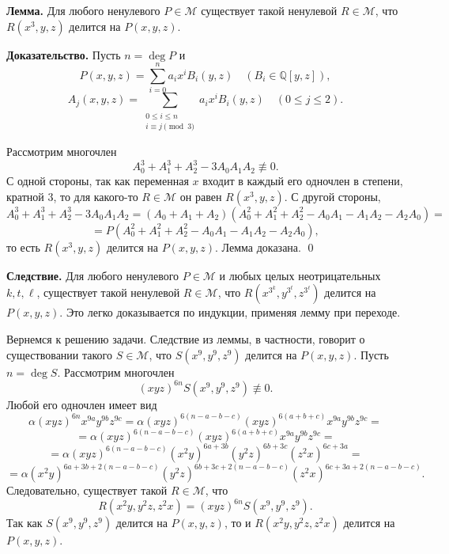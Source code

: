 \documentclass[12pt]{article}
\def \Lemma{\par \bigskip \textbf{Лемма. }}
\def \proof{\par \bigskip \textbf{Доказательство. }}
\def \corollary{\par \bigskip \textbf{Следствие. }}
\begin{document}
\Lemma Для любого ненулевого $P \in \mathcal{M}$ существует такой ненулевой $R \in \mathcal{M}$, что $R(x^3, y, z)$ делится на $P(x, y, z)$.

\proof Пусть $n = \deg P$ и
$$
P(x, y, z)
=
\sum_{i = 0}^{n}
a_i x^i B_i(y, z)
\quad
(B_i \in \mathbb{Q}[y, z]),
$$
$$
A_j(x, y, z)
=
\sum_{\substack{0 \le i \le n \\ i \equiv j \pmod{3}}}
a_i x^i B_i(y, z)
\quad
(0 \le j \le 2)
.
$$

Рассмотрим многочлен
$$
A_0^3 + A_1^3 + A_2^3 - 3 A_0 A_1 A_2 \not\equiv 0
.
$$
С одной стороны, так как переменная $x$ входит в каждый его одночлен в степени, кратной 3, то для какого-то $R \in \mathcal{M}$ он равен $R(x^3, y, z)$. С другой стороны,
$$
A_0^3 + A_1^3 + A_2^3 - 3 A_0 A_1 A_2 
=
(A_0 + A_1 + A_2)
(A_0^2 + A_1^2 + A_2^2 - A_0 A_1 - A_1 A_2 - A_2 A_0)
=
$$
$$
=
P (A_0^2 + A_1^2 + A_2^2 - A_0 A_1 - A_1 A_2 - A_2 A_0)
,
$$
то есть $R(x^3, y, z)$ делится на $P(x, y, z)$. Лемма доказана.
\qed

\corollary Для любого ненулевого $P \in \mathcal{M}$ и любых целых неотрицательных $k, t, \ell$, существует такой ненулевой $R \in \mathcal{M}$, что $R(x^{3^k}, y^{3^t}, z^{3^\ell})$ делится на $P(x, y, z)$. Это легко доказывается по индукции, применяя лемму при переходе.

\medskip

Вернемся к решению задачи. Следствие из леммы, в частности, говорит о существовании такого $S \in \mathcal{M}$, что $S(x^9, y^9, z^9)$ делится на $P(x, y, z)$. Пусть $n = \deg S$. Рассмотрим многочлен
$$
(xyz)^{6n} S(x^9, y^9, z^9) \not \equiv 0
.
$$
Любой его одночлен имеет вид
$$
\alpha (xyz)^{6n} x^{9a} y^{9b} z^{9c}
=
\alpha 
(xyz)^{6 (n - a - b - c)}
(xyz)^{6 (a + b + c)}
x^{9a} y^{9b} z^{9c}
=
$$
$$
=
\alpha 
(xyz)^{6 (n - a - b - c)}
(xyz)^{6 (a + b + c)}
x^{9a} y^{9b} z^{9c}
=
$$
$$
=
\alpha 
(xyz)^{6 (n - a - b - c)}
(x^2y)^{6a+3b}(y^2z)^{6b+3c}(z^2x)^{6c+3a}
=
$$
$$
=
\alpha
(x^2y)^{6a+3b + 2 (n - a - b - c)}
(y^2z)^{6b+3c + 2 (n - a - b - c)}
(z^2x)^{6c+3a + 2 (n - a - b - c)}
.
$$
Следовательно, существует такой $R \in \mathcal{M}$, что
$$
R(x^2 y, y^2 z, z^2 x)
=
(xyz)^{6n} S(x^9, y^9, z^9)
.
$$
Так как $S(x^9, y^9, z^9)$ делится на $P(x, y, z)$, то и $R(x^2 y, y^2 z, z^2 x)$ делится на $P(x, y, z)$.
\end{document}
